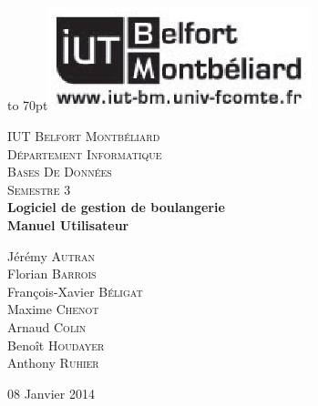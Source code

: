 \documentclass[12pt]{report}
\begin{document}
{
    \begin{titlepage}

    \vbox to 70pt{\hfill\includegraphics[height=3cm]{images/logo-iut.eps}}\
    \begin{center}

    \textsc{\LARGE IUT Belfort Montbéliard}\\[0.7cm]
    \textsc{\LARGE Département Informatique}\\[1.0cm]
    \textsc{\Large Bases De Données}\\[0.5cm]
    \textsc{\Large Semestre 3}\\[5cm]


    {\huge \bfseries Logiciel de gestion de boulangerie}\\[0.5cm]
    {\huge \bfseries Manuel Utilisateur}\\[3cm]

    \begin{large}
Jérémy \textsc{Autran}\\[0.3em]
Florian \textsc{Barrois}\\[0.3em]
François-Xavier \textsc{Béligat}\\[0.3em]
Maxime \textsc{Chenot}\\[0.3em]
Arnaud \textsc{Colin}\\[0.3em]
Benoît \textsc{Houdayer}\\[0.3em]
Anthony \textsc{Ruhier}\\[0.3em]

    \end{large}

    \vfill

    {\large 08 Janvier 2014}

    \end{center}
    \end{titlepage}
    }

    {\clearpage\mbox{}\thispagestyle{empty}\clearpage}
    \setcounter{page}{1}
    {\large{}}


    
    
    
    
    
    
    


    \tableofcontents

\end{document}
